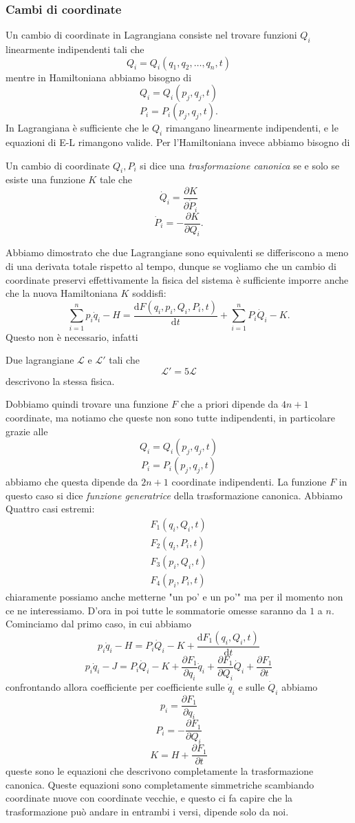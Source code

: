 \documentclass[11pt]{scrartcl}
\newcommand{\dif}{\text{d}}
\begin{document}
	\subsubsection{Cambi di coordinate}
	Un cambio di coordinate in Lagrangiana consiste nel trovare funzioni $Q_i$ linearmente indipendenti tali che 
	$$Q_i=Q_i(q_1,q_2,\dots,q_n,t)$$ 
	mentre in Hamiltoniana abbiamo bisogno di 
	$$Q_i=Q_i(p_j,q_j,t)$$
	$$P_i=P_i(p_j,q_j,t).$$
	In Lagrangiana è sufficiente che le $Q_i$ rimangano linearmente indipendenti, e le equazioni di E-L rimangono valide. Per l'Hamiltoniana invece abbiamo bisogno di
	\begin{definition}
		Un cambio di coordinate $Q_i,P_i$ si dice una \textit{trasformazione canonica} se e solo se esiste una funzione $K$ tale che
		$$\dot{Q}_i=\frac{\partial K}{\partial \dot{P}_i}$$
		$$\dot{P}_i=-\frac{\partial K}{\partial Q_i}.$$
	\end{definition}
	Abbiamo dimostrato che due Lagrangiane sono equivalenti se differiscono a meno di una derivata totale rispetto al tempo, dunque se vogliamo che un cambio di coordinate preservi effettivamente la fisica del sistema è sufficiente imporre anche che la nuova Hamiltoniana $K$ soddisfi:
	$$\sum_{i=1}^{n}p_i\dot{q}_i-H=\frac{\dif F(q_i,p_i,Q_i,P_i,t)}{\dif t}+\sum_{i=1}^{n}P_i \dot{Q}_i -K.$$
	Questo non è necessario, infatti
	\begin{example}
		Due lagrangiane $\mathcal{L}$ e $\mathcal{L}'$ tali che
		$$\mathcal{L}'=5\mathcal{L}$$
		descrivono la stessa fisica.
	\end{example}
	Dobbiamo quindi trovare una funzione $F$ che a priori dipende da $4n+1$ coordinate, ma notiamo che queste non sono tutte indipendenti, in particolare grazie alle 
	$$Q_i=Q_i(p_j,q_j,t)$$
	$$P_i=P_i(p_j,q_j,t)$$
	abbiamo che questa dipende da $2n+1$ coordinate indipendenti. La funzione $F$ in questo caso si dice \textit{funzione generatrice} della trasformazione canonica. Abbiamo Quattro casi estremi:
	\begin{gather}
		F_1(q_i,Q_i,t) \\
		F_2(q_i,P_i,t) \\
		F_3(p_i,Q_i,t) \\
		F_4(p_i,P_i,t)
	\end{gather}
	chiaramente possiamo anche metterne "un po' e un po'" ma per il momento non ce ne interessiamo. D'ora in poi tutte le sommatorie omesse saranno da $1$ a $n$. Cominciamo dal primo caso, in cui abbiamo
	$$p_i\dot{q}_i-H=P_i\dot{Q}_i-K+\frac{\dif F_1(q_i,Q_i,t)}{\dif t}$$
	$$p_i\dot{q}_i-J=P_i\dot{Q}_i-K+\frac{\partial F_1}{\partial q_i}\dot{q}_i+\frac{\partial F_1}{\partial Q_i}\dot{Q}_i+\frac{\partial F_1}{\partial t}$$
	confrontando allora coefficiente per coefficiente sulle $\dot{q}_i$ e sulle $\dot{Q}_i$ abbiamo
	$$p_i=\frac{\partial F_1}{\partial q_i}$$
	$$P_i=-\frac{\partial F_1}{\partial Q_i}$$
	$$K=H+\frac{\partial F_1}{\partial t}$$
	queste sono le equazioni che descrivono completamente la trasformazione canonica. Queste equazioni sono completamente simmetriche scambiando coordinate nuove con coordinate vecchie, e questo ci fa capire che la trasformazione può andare in entrambi i versi, dipende solo da noi. \\
\end{document}
